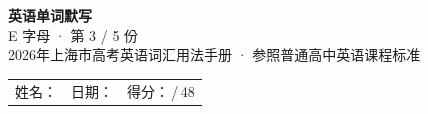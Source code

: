 \documentclass[10pt,a4paper]{article}
\begin{document}
\pagestyle{plain}

\begin{center}
{\LARGE\bfseries 英语单词默写}\\[0.22em]
{\large E 字母 · 第 3 / 5 份}\\[0.18em]
{\small 2026年上海市高考英语词汇用法手册 · 参照普通高中英语课程标准}
\end{center}

\vspace{0.25em}
\noindent\begin{tabular}{@{}p{}@{}p{}@{}p{}@{}}
姓名：\underline{\hspace{2.0cm}} & 日期：\underline{\hspace{2.0cm}} & 得分：\underline{\hspace{1.3cm}}\,/\,48 \\
\end{tabular}

\vspace{0.3em}

\vspace{0.08em}
\end{document}
